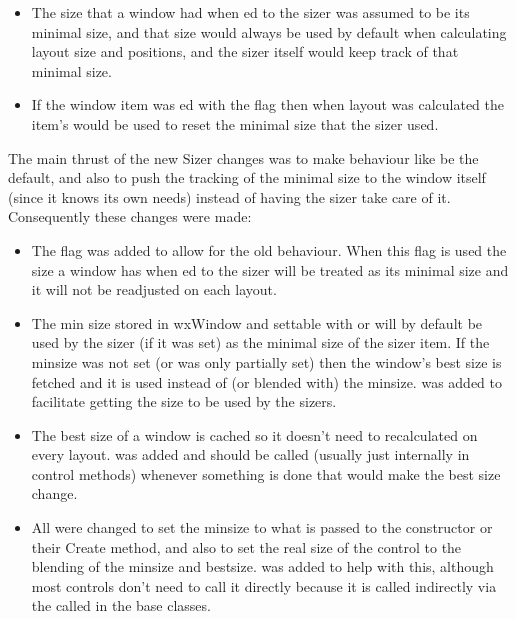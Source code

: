 \begin{itemize}\itemsep=0pt
\item The size that a window had when ed to the sizer was assumed
      to be its minimal size, and that size would always be used by
      default when calculating layout size and positions, and the
      sizer itself would keep track of that minimal size.

\item If the window item was ed with the  flag
      then when layout was calculated the item's  would be
      used to reset the minimal size that the sizer used.
\end{itemize}

  The main thrust of the new Sizer changes was to make behaviour like
   be the default, and also to push the tracking of
  the minimal size to the window itself (since it knows its own needs)
  instead of having the sizer take care of it.  Consequently these
  changes were made:

\begin{itemize}\itemsep=0pt
\item The  flag was added to allow for the old
      behaviour.  When this flag is used the size a window has when
      ed to the sizer will be treated as its minimal size and it
      will not be readjusted on each layout.

\item The min size stored in wxWindow and settable with  or
       will by default be used by the sizer (if it was set)
      as the minimal size of the sizer item.  If the minsize was not
      set (or was only partially set) then the window's best size is
      fetched and it is used instead of (or blended with) the minsize.
       was added to facilitate getting the
      size to be used by the sizers.

\item The best size of a window is cached so it doesn't need to
      recalculated on every layout.  was
      added and should be called (usually just internally in control
      methods) whenever something is done that would make the best
      size change.

\item All  were changed to set the minsize to what is passed
      to the constructor or their Create method, and also to set the real
      size of the control to the blending of the minsize and bestsize.
       was added to help with this,
      although most controls don't need to call it directly because it
      is called indirectly via the  called in the base
      classes.
\end{itemize}

